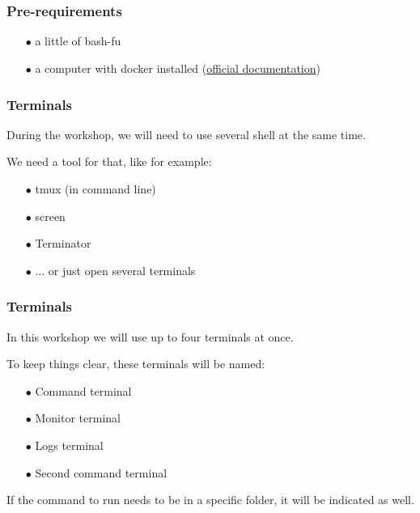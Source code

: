 \section*{}

	\begin{frame}
		\frametitle{Pre-requirements}

		\begin{itemize}
			\item[$\bullet$] a little of bash-fu
			\item[$\bullet$] a computer with docker installed (\href{https://docs.docker.com/v17.09/engine/installation/}{official documentation})
		\end{itemize}
		
	\end{frame}
	
	\begin{frame}
		\frametitle{Terminals}
		
		During the workshop, we will need to use several shell at the same time.
		
		\medskip
		
		We need a tool for that, like for example:
		\begin{itemize}
			\item[$\bullet$] tmux (in command line)
			\item[$\bullet$] screen
			\item[$\bullet$] Terminator
			\item[$\bullet$] ... or just open several terminals
		\end{itemize}
	\end{frame}
	
	\begin{frame}
		\frametitle{Terminals}
		
		In this workshop we will use up to four terminals at once.
		
		\bigskip
		
		To keep things clear, these terminals will be named:
		\begin{itemize}
			\item[$\bullet$] Command terminal
			\item[$\bullet$] Monitor terminal
			\item[$\bullet$] Logs terminal
			\item[$\bullet$] Second command terminal
		\end{itemize}
		
		\bigskip
		
		If the command to run needs to be in a specific folder, it will be indicated as well.
	\end{frame}

